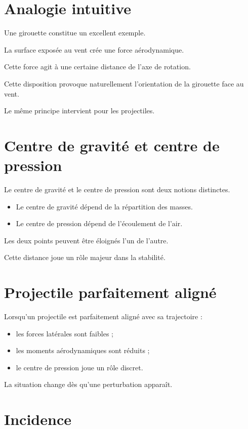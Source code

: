 \section{Analogie intuitive}

Une girouette constitue un excellent exemple.

La surface exposée au vent crée une force aérodynamique.

Cette force agit à une certaine distance de l'axe de rotation.

Cette disposition provoque naturellement l'orientation de la girouette face
au vent.

Le même principe intervient pour les projectiles.

\section{Centre de gravité et centre de pression}

Le centre de gravité et le centre de pression sont deux notions distinctes.

\begin{itemize}
    \item Le centre de gravité dépend de la répartition des masses.
    \item Le centre de pression dépend de l'écoulement de l'air.
\end{itemize}

Les deux points peuvent être éloignés l'un de l'autre.

Cette distance joue un rôle majeur dans la stabilité.

\section{Projectile parfaitement aligné}

Lorsqu'un projectile est parfaitement aligné avec sa trajectoire :

\begin{itemize}
    \item les forces latérales sont faibles ;
    \item les moments aérodynamiques sont réduits ;
    \item le centre de pression joue un rôle discret.
\end{itemize}

La situation change dès qu'une perturbation apparaît.

\section{Incidence}

